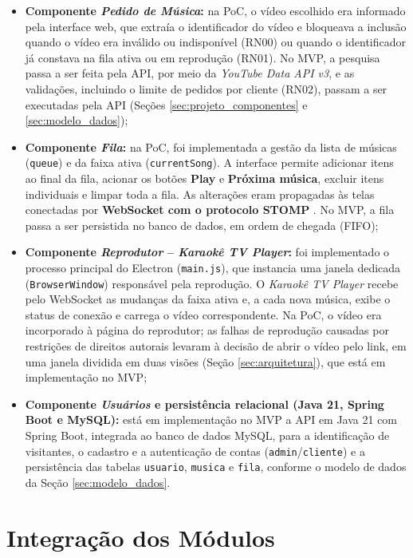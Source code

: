 \begin{itemize}
  \item \textbf{Componente \textit{Pedido de Música}:} na PoC, o vídeo escolhido era informado pela interface web, que extraía o identificador do vídeo e bloqueava a inclusão quando o vídeo era inválido ou indisponível (RN00) ou quando o identificador já constava na fila ativa ou em reprodução (RN01). No MVP, a pesquisa passa a ser feita pela API, por meio da \textit{YouTube Data API v3}, e as validações, incluindo o limite de pedidos por cliente (RN02), passam a ser executadas pela API (Seções \ref{sec:projeto_componentes} e \ref{sec:modelo_dados});
  \item \textbf{Componente \textit{Fila}:} na PoC, foi implementada a gestão da lista de músicas (\texttt{queue}) e da faixa ativa (\texttt{currentSong}). A interface permite adicionar itens ao final da fila, acionar os botões \textbf{Play} e \textbf{Próxima música}, excluir itens individuais e limpar toda a fila. As alterações eram propagadas às telas conectadas por \textbf{WebSocket com o protocolo STOMP} \cite{stomp2012}. No MVP, a fila passa a ser persistida no banco de dados, em ordem de chegada (FIFO);
  \item \textbf{Componente \textit{Reprodutor} -- \textit{Karaokê TV Player}:} foi implementado o processo principal do Electron (\texttt{main.js}), que instancia uma janela dedicada (\texttt{BrowserWindow}) responsável pela reprodução. O \textit{Karaokê TV Player} recebe pelo WebSocket as mudanças da faixa ativa e, a cada nova música, exibe o status de conexão e carrega o vídeo correspondente. Na PoC, o vídeo era incorporado à página do reprodutor; as falhas de reprodução causadas por restrições de direitos autorais levaram à decisão de abrir o vídeo pelo link, em uma janela dividida em duas visões (Seção \ref{sec:arquitetura}), que está em implementação no MVP;
  \item \textbf{Componente \textit{Usuários} e persistência relacional (Java 21, Spring Boot e MySQL):} está em implementação no MVP a API em Java 21 com Spring Boot, integrada ao banco de dados MySQL, para a identificação de visitantes, o cadastro e a autenticação de contas (\texttt{admin}/\texttt{cliente}) e a persistência das tabelas \texttt{usuario}, \texttt{musica} e \texttt{fila}, conforme o modelo de dados da Seção \ref{sec:modelo_dados}.
\end{itemize}

\section{Integração dos Módulos} \label{sec:integracao}

